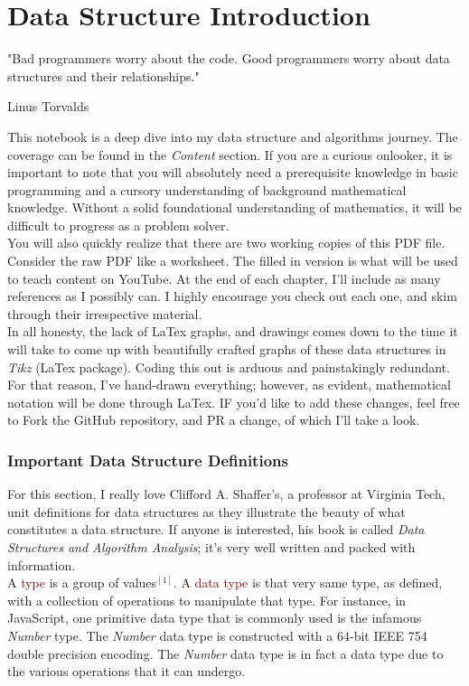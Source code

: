 \frenchspacing
\chapter{Data Structure Introduction}
\epigraph{"Bad programmers worry about the code. Good programmers worry about data structures and their relationships."}{Linus Torvalds}

This notebook is a deep dive into my data structure and algorithms journey. The coverage can be found in the \textit{Content} section. If you are a curious onlooker, it is important to note that you will absolutely need a prerequisite knowledge in basic programming and a cursory understanding of background mathematical knowledge. Without a solid foundational understanding of mathematics, it will be difficult to progress as a problem solver. 
\\

You will also quickly realize that there are two working copies of this PDF file. Consider the raw PDF like a worksheet. The filled in version is what will be used to teach content on YouTube. At the end of each chapter, I'll include as many references as I possibly can. I highly encourage you check out each one, and skim through their irrespective material. 
\\
    
In all honesty, the lack of LaTex graphs, and drawings comes down to the time it will take to come up with beautifully crafted graphs of these data structures in \textit{Tikz} (LaTex package). Coding this out is arduous and painstakingly redundant. For that reason, I've hand-drawn everything; however, as evident, mathematical notation will be done through LaTex. IF you'd like to add these changes, feel free to Fork the GitHub repository, and PR a change, of which I'll take a look.

\subsection{Important Data Structure Definitions}

For this section, I really love Clifford A. Shaffer's, a professor at Virginia Tech, unit definitions for data structures as they illustrate the beauty of what constitutes a data structure. If anyone is interested, his book is called \textit{Data Structures and Algorithm Analysis}; it's very well written and packed with information. 
\\

A \textcolor{Maroon}{type} is a group of values$^{[1]}$. A  \textcolor{Maroon}{data type} is that very same type, as defined, with a collection of operations to manipulate that type. For instance, in JavaScript, one primitive data type that is commonly used is the infamous \textit{Number} type. The \textit{Number} data type is constructed with a 64-bit IEEE 754 double precision encoding. The \textit{Number} data type is in fact a data type due to the various operations that it can undergo.
\\

